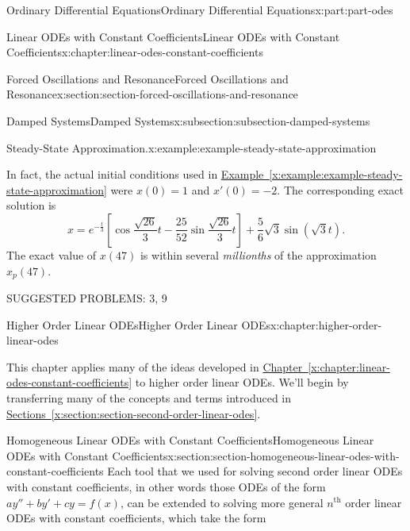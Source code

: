 \documentclass[twoside,10pt,]{book}
\newcommand{\xreffont}{\relax}
\numberwithin{equation}{part}
\begin{document}
\begin{partptx}{Ordinary Differential Equations}{}{Ordinary Differential Equations}{}{}{x:part:part-odes}
\begin{chapterptx}{Linear ODEs with Constant Coefficients}{}{Linear ODEs with Constant Coefficients}{}{}{x:chapter:linear-odes-constant-coefficients}
\begin{sectionptx}{Forced Oscillations and Resonance}{}{Forced Oscillations and Resonance}{}{}{x:section:section-forced-oscillations-and-resonance}
\begin{subsectionptx}{Damped Systems}{}{Damped Systems}{}{}{x:subsection:subsection-damped-systems}
\begin{example}{Steady-State Approximation.}{x:example:example-steady-state-approximation}
\end{example}
In fact, the actual initial conditions used in \hyperref[x:example:example-steady-state-approximation]{Example~{\xreffont\ref{x:example:example-steady-state-approximation}}} were \(x(0) = 1\) and \(x'(0) = -2\). The corresponding exact solution is%
\begin{equation*}
x = e^{-\frac{t}{3}}\left[\cos\frac{\sqrt{26}}{3}t - \frac{25}{52}\sin\frac{\sqrt{26}}{3}t\right] + \frac{5}{6}\sqrt{3}\sin(\sqrt{3}t).
\end{equation*}
The exact value of \(x(47)\) is within several \emph{millionths} of the approximation \(x_{p}(47)\).%
\end{subsectionptx}
\begin{conclusion}{}%
SUGGESTED PROBLEMS: 3, 9%
\end{conclusion}%
\end{sectionptx}
\end{chapterptx}
%
\typeout{************************************************}
\typeout{************************************************}
%
\begin{chapterptx}{Higher Order Linear ODEs}{}{Higher Order Linear ODEs}{}{}{x:chapter:higher-order-linear-odes}
\begin{introduction}{}%
This chapter applies many of the ideas developed in \hyperref[x:chapter:linear-odes-constant-coefficients]{Chapter~{\xreffont\ref{x:chapter:linear-odes-constant-coefficients}}} to higher order linear ODEs. We'll begin by transferring many of the concepts and terms introduced in \hyperref[x:section:section-second-order-linear-odes]{Sections~{\xreffont\ref{x:section:section-second-order-linear-odes}}\textendash{}{\xreffont\ref{x:section:section-homogeneous-odes-with-constant-coefficients}}}.%
\end{introduction}%
%
%
\typeout{************************************************}
\typeout{************************************************}
%
\begin{sectionptx}{Homogeneous Linear ODEs with Constant Coefficients}{}{Homogeneous Linear ODEs with Constant Coefficients}{}{}{x:section:section-homogeneous-linear-odes-with-constant-coefficients}
Each tool that we used for solving second order linear ODEs with constant coefficients, in other words those ODEs of the form \(ay''+by'+cy=f(x)\), can be extended to solving more general \(n^{\text{th}}\) order linear ODEs with constant coefficients, which take the form%

\end{sectionptx}
\end{chapterptx}
\end{partptx}
\end{document}
